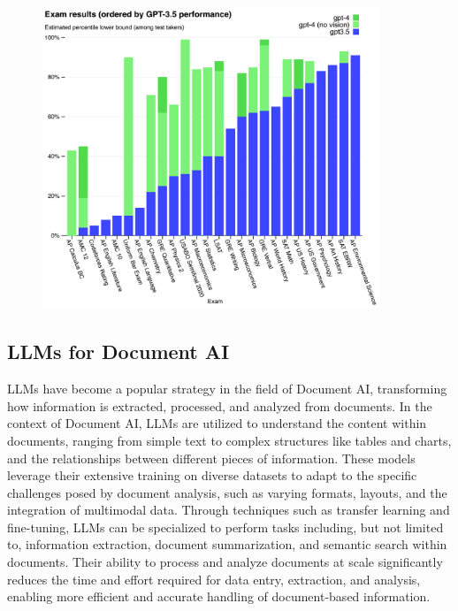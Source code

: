 \documentclass[english, 12pt, a4paper, elec, utf8, a-2b, online]{aaltothesis}
\begin{document}
\begin{figure}[H]
    \centering
    \includegraphics[width=0.9\textwidth]{images/gpt_exam_results.png}
    \caption{}
    \label{fig:gpt_exam_results}
\end{figure}

\subsection{LLMs for Document AI}

\ac{LLM}s have become a popular strategy in the field of Document \ac{AI}, transforming how information is extracted, processed, and analyzed from documents.
In the context of Document \ac{AI}, \ac{LLM}s are utilized to understand the content within documents, ranging from simple text to complex structures like tables and charts, and the relationships between different pieces of information.
These models leverage their extensive training on diverse datasets to adapt to the specific challenges posed by document analysis, such as varying formats, layouts, and the integration of multimodal data.
Through techniques such as transfer learning and fine-tuning, \ac{LLM}s can be specialized to perform tasks including, but not limited to, information extraction, document summarization, and semantic search within documents.
Their ability to process and analyze documents at scale significantly reduces the time and effort required for data entry, extraction, and analysis, enabling more efficient and accurate handling of document-based information.
\end{document}
